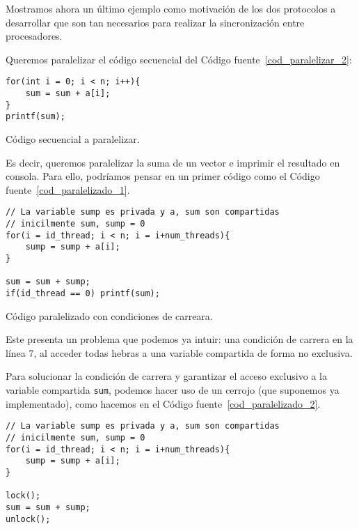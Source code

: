 Mostramos ahora un último ejemplo como motivación de los dos protocolos a desarrollar que son tan necesarios para realizar la sincronización entre procesadores.
\begin{ejemplo}
    Queremos paralelizar el código secuencial del Código fuente~\ref{cod_paralelizar_2}:
\begin{listing}[H]
\centering
\begin{verbatim}
for(int i = 0; i < n; i++){
    sum = sum + a[i];
}
printf(sum);
\end{verbatim}
\caption{Código secuencial a paralelizar.}
\label{cod_paralelizar_2}
\end{listing}
Es decir, queremos paralelizar la suma de un vector e imprimir el resultado en consola. Para ello, podríamos pensar en un primer código como el Código fuente~\ref{cod_paralelizado_1}.
\begin{listing}[H]
\centering
\begin{verbatim}
// La variable sump es privada y a, sum son compartidas
// inicilmente sum, sump = 0
for(i = id_thread; i < n; i = i+num_threads){
    sump = sump + a[i];
}

sum = sum + sump;
if(id_thread == 0) printf(sum);
\end{verbatim}
\caption{Código paralelizado con condiciones de carreara.}
\label{cod_paralelizado_1}
\end{listing}

Este presenta un problema que podemos ya intuir: una condición de carrera en la línea 7, al acceder todas hebras a una variable compartida de forma no exclusiva.

Para solucionar la condición de carrera y garantizar el acceso exclusivo a la variable compartida \verb|sum|, podemos hacer uso de un cerrojo (que suponemos ya implementado), como hacemos en el Código fuente~\ref{cod_paralelizado_2}.
\begin{listing}[H]
\centering
\begin{verbatim}
// La variable sump es privada y a, sum son compartidas
// inicilmente sum, sump = 0
for(i = id_thread; i < n; i = i+num_threads){
    sump = sump + a[i];
}

lock();
sum = sum + sump;
unlock();


\end{verbatim}
\end{listing}
\end{ejemplo}
